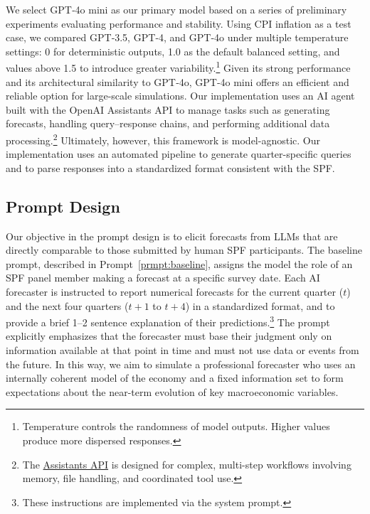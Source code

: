 \documentclass[11pt,letterpaper]{scrartcl}
\begin{document}
We select GPT‑4o mini as our primary model based on a series of preliminary experiments evaluating performance and stability. Using CPI inflation as a test case, we compared GPT‑3.5, GPT‑4, and GPT‑4o under multiple temperature settings: 0 for deterministic outputs, 1.0 as the default balanced setting, and values above 1.5 to introduce greater variability.\footnote{Temperature controls the randomness of model outputs. Higher values produce more dispersed responses.} Given its strong performance and its architectural similarity to GPT‑4o, GPT‑4o mini offers an efficient and reliable option for large-scale simulations. Our implementation uses an AI agent built with the OpenAI Assistants API to manage tasks such as generating forecasts, handling query–response chains, and performing additional data processing.\footnote{The \href{https://platform.openai.com/docs/assistants/overview}{Assistants API} is designed for complex, multi-step workflows involving memory, file handling, and coordinated tool use.} Ultimately, however, this framework is model-agnostic.
 Our implementation uses an automated pipeline to generate quarter-specific queries and to parse responses into a standardized format consistent with the SPF.

\subsection{Prompt Design}

Our objective in the prompt design is to elicit forecasts from LLMs that are directly comparable to those submitted by human SPF participants. The baseline prompt, described in Prompt~\ref{prmpt:baseline}, assigns the model the role of an SPF panel member making a forecast at a specific survey date. Each AI forecaster is instructed to report numerical forecasts for the current quarter ($t$) and the next four quarters ($t+1$ to $t+4$) in a standardized format, and to provide a brief 1--2 sentence explanation of their predictions.\footnote{These instructions are implemented via the system prompt.} The prompt explicitly emphasizes that the forecaster must base their judgment only on information available at that point in time and must not use data or events from the future. In this way, we aim to simulate a professional forecaster who uses an internally coherent model of the economy and a fixed information set to form expectations about the near-term evolution of key macroeconomic variables.
\end{document}
